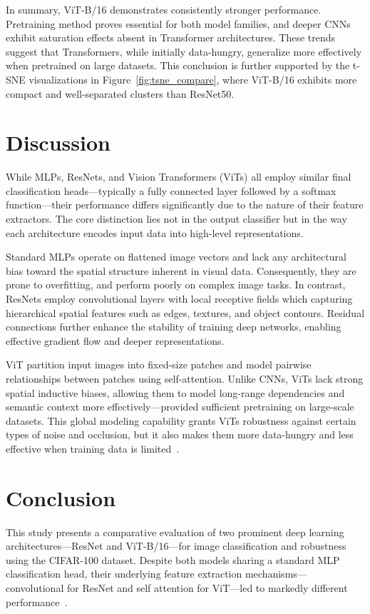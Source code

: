\documentclass[conference]{IEEEtran}
\begin{document}
In summary, ViT-B/16 demonstrates consistently stronger performance. Pretraining method proves essential for both model families, and deeper CNNs exhibit saturation effects absent in Transformer architectures. These trends suggest that Transformers, while initially data-hungry, generalize more effectively when pretrained on large datasets. This conclusion is further supported by the t-SNE visualizations in Figure~\ref{fig:tsne_compare}, where ViT-B/16 exhibits more compact and well-separated clusters than ResNet50.


\section{Discussion}
While MLPs, ResNets, and Vision Transformers (ViTs) all employ similar final classification heads—typically a fully connected layer followed by a softmax function—their performance differs significantly due to the nature of their feature extractors. The core distinction lies not in the output classifier but in the way each architecture encodes input data into high-level representations.

Standard MLPs operate on flattened image vectors and lack any architectural bias toward the spatial structure inherent in visual data. Consequently, they are prone to overfitting, and perform poorly on complex image tasks. In contrast, ResNets employ convolutional layers with local receptive fields which capturing hierarchical spatial features such as edges, textures, and object contours. Residual connections further enhance the stability of training deep networks, enabling effective gradient flow and deeper representations.

ViT partition input images into fixed-size patches and model pairwise relationships between patches using self-attention. Unlike CNNs, ViTs lack strong spatial inductive biases, allowing them to model long-range dependencies and semantic context more effectively—provided sufficient pretraining on large-scale datasets. This global modeling capability grants ViTs robustness against certain types of noise and occlusion, but it also makes them more data-hungry and less effective when training data is limited~\cite{park2022vision}.

\section{Conclusion}
This study presents a comparative evaluation of two prominent deep learning architectures—ResNet and ViT-B/16—for image classification and robustness using the CIFAR-100 dataset. Despite both models sharing a standard MLP classification head, their underlying feature extraction mechanisms—convolutional for ResNet and self attention for ViT—led to markedly different performance~\cite{wu2022tinyvit}.
\end{document}
